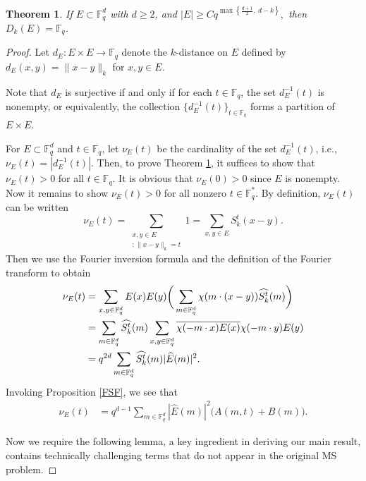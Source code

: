 \documentclass[10pt,a4paper]{amsart}
\newtheorem{theorem}{Theorem}
\def\Fq#1{\mathbb{F}_q^{#1}}
\def\knorm#1#2{\lVert#2\rVert_{#1}}
\def\pnorm#1#2{|#2|_{#1}}
\begin{document}
\begin{theorem} \label{first*}
If $E \subset \mathbb{F}_q^d$ with $d \ge 2$, and 
$
|E| \ge C  q^{\max\left\{ \frac{d+1}{2},\ d - k \right\}},
$ then $D_k(E) = \mathbb{F}_q$.
\end{theorem}

\begin{proof}
Let \( d_E : E \times E \to \mathbb{F}_q \) denote the $k$-distance on $E$ defined by $
d_E(x,y) = \|x - y\|_{k}$ for $x,y \in E$.

Note that \( d_E \) is surjective if and only if for each \( t \in \mathbb{F}_q \), the set \( d_E^{-1}(t) \) is nonempty, or equivalently, the collection \( \{d_E^{-1}(t)\}_{t \in \mathbb{F}_q} \) forms a partition of \( E \times E \).

For $E \subset \Fq{d}$ and $t \in \Fq{}$, let $\nu_{E}(t)$ be the cardinality of the set $d_E^{-1}(t)$, i.e., $\nu_E(t)=\left|d_E^{-1} (t)\right|$. Then, to prove Theorem \ref{first*}, it suffices to show that $\nu_E(t) > 0$ for all  $t \in \Fq{}$. It is obvious that $\nu_E(0) > 0$ since $E$ is nonempty. Now it remains to  show  $\nu_E(t) > 0$
 for all nonzero $t \in \Fq{*}$.
By definition, $\nu_E(t)$ can be written
\begin{equation}\label{Nu}
\nu_{E}(t) = \sum_{\substack{{x,y\in E}\\{:\knorm{k}{x-y}=t}}}1 = \sum_{x,y\in E}S_{k}^t(x-y).
\end{equation}
Then we use  the Fourier inversion formula and the definition of the Fourier transform to obtain
\begin{align}\label{Nu1}
    \nu_E(t) & = \sum_{x,y \in \Fq{d}}E(x)E(y)\bigg{(}\sum_{m \in \Fq{d}}\chi(m\cdot(x-y))\widehat{S_{k}^t}(m)\bigg{)} \notag\\
    & = \sum_{m \in \Fq{d}} \widehat{S_{k}^t}(m) \sum_{x,y \in \Fq{d}}\overline{\chi(-m\cdot x)E(x)}\chi(-m\cdot y)E(y)\\
    & = q^{2d}\sum_{m\in\Fq{d}}\widehat{S_{k}^t}(m)|\widehat{E}(m)|^2.\notag
\end{align}
Invoking Proposition \ref{FSF},  we see that
 \begin{align}\label{AB}
\nu_{E}(t) &=q^{d-1}\sum_{m\in \Fq{d}}\pnorm{}{\widehat{E}(m)}^2\bigg(A(m,t)+B(m)
\bigg).
\end{align}

Now we  require the following lemma, a key ingredient in deriving our main result,   contains  technically challenging terms that do not appear in the original MS problem.


\end{proof}
\end{document}
